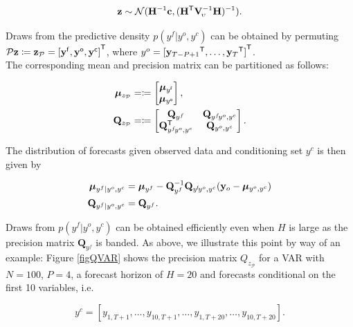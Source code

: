 \documentclass[notitlepage,a4paper,12pt]{article}
\newcommand{\transpose}[1]{{#1}^{\sf{T}}}
\begin{document}
\begin{ThreePartTable}
$$
\mathbf{z} \sim \mathcal{N}(\mathbf{H}^{-1} \mathbf{c}, (\transpose{\mathbf{H}} \mathbf{V}^{-1}_{\!\upsilon}\mathbf{H})^{-1}).
$$

Draws from the predictive density $p(y^f| y^o, y^c)$ can be obtained by permuting $\mathcal{P} \mathbf{z} \coloneqq \mathbf{z}_{\mathcal{P}} = \transpose{[\mathbf{y}^{\sf{f}}, \mathbf{y}^{\sf{o}}, \mathbf{y}^{\sf{c}}]}$, where $y^o = \transpose{[\transpose{\mathbf{y}_{T-P+1}}, \dots, \transpose{\mathbf{y}_T}]}$.\\

The corresponding mean and precision matrix can be partitioned as follows:

\begin{align*}
    \boldsymbol{\mu}_{z_{\mathcal{P}}} &= 
    \coloneqq
    \begin{bmatrix}
        \boldsymbol{\mu}_{y^{\sf{f}}} \\
        \boldsymbol{\mu}_{y^{\sf{o}}}
    \end{bmatrix}
    ,\\
    \mathbf{Q}_{z_{\mathcal{P}}} &= 
    \coloneqq
    \begin{bmatrix}
        \mathbf{Q}_{y^f} & \mathbf{Q}_{y^f\!y^o, y^c} \\
        \mathbf{Q}^{\sf{T}}_{y^f\!y^o, y^c} & \mathbf{Q}_{y^o, y^c}
    \end{bmatrix}
    .
\end{align*}

The distribution of forecasts given observed data and conditioning set $y^c$ is then given by 

\begin{align*}
    \boldsymbol{\mu}_{y^f|y^o, y^c} &= 
    \boldsymbol{\mu}_{y^f} - \mathbf{Q}_{y^f}^{-1} \mathbf{Q}_{y^{\sf{f}}\!y^o, y^c} (\mathbf{y}_o - \boldsymbol{\mu}_{y^o, y^c})\\
    \mathbf{Q}_{y^f|y^o, y^c} &= \mathbf{Q}_{y^f}.
\end{align*}

Draws from $p(y^f|y^o, y^c)$ can be obtained efficiently even when $H$ is large as the precision matrix $\mathbf{Q}_{y^f}$ is banded. As above, we illustrate this point by way of an example: Figure \ref{figQVAR} shows the precision matrix $Q_{z_{\mathcal{P}}}$ for a VAR with $N=100$, $P=4$, a forecast horizon of $H=20$ and forecasts conditional on the first 10 variables, i.e. 

$$y^c = [y_{1,T+1}, \dots, y_{10,T+1}, \dots, y_{1,T+20}, \dots, y_{10,T+20}].$$


\end{ThreePartTable}
\end{document}
